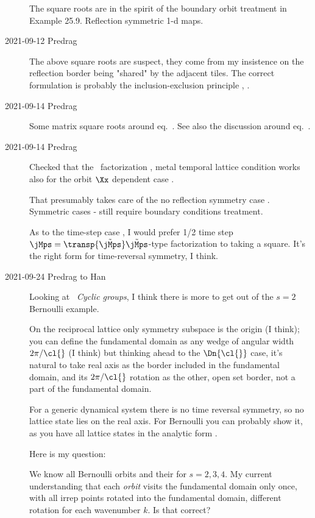 \begin{description}
The square roots are in the spirit of the boundary orbit treatment in
 {Example 25.9. Reflection symmetric 1-d maps}.

\item[2021-09-12 Predrag]
The above square roots are suspect, they come from my insistence on the
reflection border being "shared" by the adjacent tiles. The
correct formulation is probably the inclusion-exclusion principle
, .

\item[2021-09-14 Predrag]
Some matrix square roots around eq.~.
See also the discussion around eq.~.

\item[2021-09-14 Predrag]
    Checked that the \jacobianOrb\ factorization ,
    metal temporal lattice condition  works also for
    the orbit $\Xx$ dependent case .

    That presumably takes care of the no reflection symmetry case
    . Symmetric cases
    - still require boundary
    conditions treatment.

    As to the time-step case , I would prefer
    1/2 time step
    $\jMps=\transp{\tilde{\jMps}}\tilde{\jMps}$-type factorization
    to taking a square. It's the right form for time-reversal symmetry,
    I think.

\item[2021-09-24 Predrag to Han]
Looking at ~{\em Cyclic groups}, I think there
is more to get out of the ${s}=2$ Bernoulli example.

On the reciprocal lattice only symmetry subspace is the origin (I think);
you can define the fundamental domain as any wedge of angular width
$2\pi/\cl{}$  (I think) but thinking ahead to the $\Dn{\cl{}}$ case, it's
natural to take real axis as the border included in the fundamental
domain, and its $2\pi/\cl{}$ rotation as the other, open set
border, not a part of the fundamental domain.

For a generic dynamical system there is no time reversal symmetry, so no
lattice state lies on the real axis. For Bernoulli you can probably show
it, as you have all lattice states in the analytic form
.

Here is my question:

We know all
 Bernoulli orbits
and
their  for ${s}=2,3,4$.
My current understanding that each \emph{orbit} visits the fundamental
domain only once, with all irrep points rotated into the fundamental
domain, different rotation for each wavenumber $k$. Is that correct?


\end{description}
